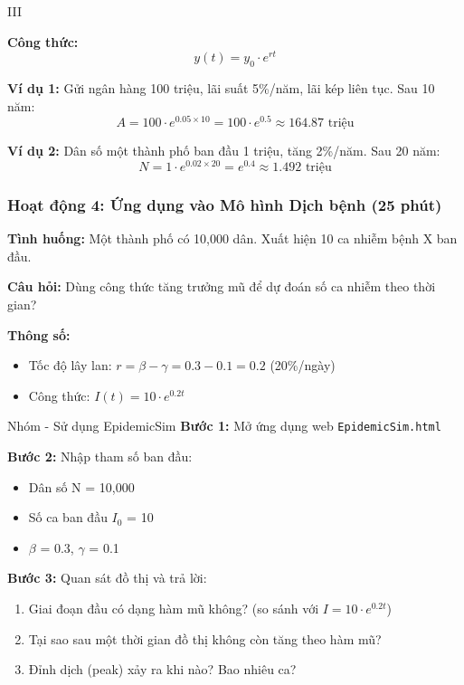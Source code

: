 \documentclass[12pt,a4paper]{article}
\begin{document}
\begin{competitionsection}{III}
\begin{mathbox}
\textbf{Công thức:}
$$y(t) = y_0 \cdot e^{rt}$$

\textbf{Ví dụ 1:} Gửi ngân hàng 100 triệu, lãi suất 5\%/năm, lãi kép liên tục. Sau 10 năm:
$$A = 100 \cdot e^{0.05 \times 10} = 100 \cdot e^{0.5} \approx 164.87 \text{ triệu}$$

\textbf{Ví dụ 2:} Dân số một thành phố ban đầu 1 triệu, tăng 2\%/năm. Sau 20 năm:
$$N = 1 \cdot e^{0.02 \times 20} = e^{0.4} \approx 1.492 \text{ triệu}$$
\end{mathbox}

\subsubsection*{Hoạt động 4: Ứng dụng vào Mô hình Dịch bệnh (25 phút)}
\begin{realworld}
\textbf{Tình huống:} Một thành phố có 10,000 dân. Xuất hiện 10 ca nhiễm bệnh X ban đầu.

\textbf{Câu hỏi:} Dùng công thức tăng trưởng mũ để dự đoán số ca nhiễm theo thời gian?

\textbf{Thông số:}
\begin{itemize}[leftmargin=*,noitemsep]
\item Tốc độ lây lan: $r = \beta - \gamma = 0.3 - 0.1 = 0.2$ (20\%/ngày)
\item Công thức: $I(t) = 10 \cdot e^{0.2t}$
\end{itemize}
\end{realworld}

\begin{task}{Nhóm - Sử dụng EpidemicSim}
\textbf{Bước 1:} Mở ứng dụng web \texttt{EpidemicSim.html}

\textbf{Bước 2:} Nhập tham số ban đầu:
\begin{itemize}[leftmargin=*,noitemsep]
\item Dân số N = 10,000
\item Số ca ban đầu $I_0$ = 10
\item $\beta$ = 0.3, $\gamma$ = 0.1
\end{itemize}

\textbf{Bước 3:} Quan sát đồ thị và trả lời:
\begin{enumerate}[leftmargin=*,noitemsep]
\item Giai đoạn đầu có dạng hàm mũ không? (so sánh với $I = 10 \cdot e^{0.2t}$)
\item Tại sao sau một thời gian đồ thị không còn tăng theo hàm mũ?
\item Đỉnh dịch (peak) xảy ra khi nào? Bao nhiêu ca?
\end{enumerate}


\end{task}
\end{competitionsection}
\end{document}
